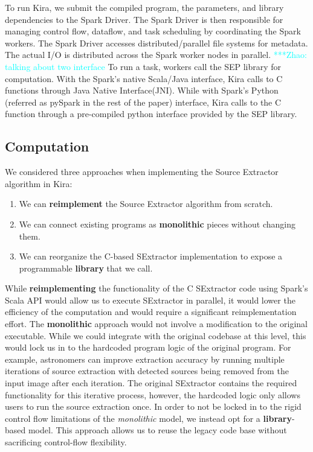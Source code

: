 \documentclass[10pt,journal,compsoc]{IEEEtran}
\newcommand{\zhaonote}[1]{{\textcolor{cyan}    { ***Zhao:      #1 }}}
\newcommand{\zhaonote}[1]{}
\begin{document}
To run Kira, we submit the compiled program, the parameters, and library dependencies to the Spark Driver.
The Spark Driver is then responsible for managing control flow, dataflow, and task scheduling 
by coordinating the Spark workers. 
The Spark Driver accesses distributed/parallel file systems for metadata.
The actual I/O is distributed across the Spark worker nodes in parallel. 
\zhaonote{talking about two interface}
To run a task, workers call the SEP library for computation.
With the Spark's native Scala/Java interface, Kira calls to C functions through Java Native Interface(JNI).
While with Spark's Python (referred as pySpark in the rest of the paper) interface, Kira calls to the C function through
a pre-compiled python interface provided by the SEP library. 

\subsection{Computation}
\label{sec:Design-Computation}
We considered three approaches when implementing the Source Extractor algorithm in Kira:

\begin{enumerate}
\item We can \textbf{reimplement} the Source Extractor algorithm from scratch.
\item We can connect existing programs as \textbf{monolithic} pieces without changing them.
\item We can reorganize the C-based SExtractor implementation to expose a programmable
\textbf{library} that we call.
\end{enumerate}

While \textbf{reimplementing} the functionality of the C SExtractor code using Spark's Scala API 
would allow us to execute SExtractor in parallel, it would lower the efficiency of the computation 
and would require a significant reimplementation effort.
The \textbf{monolithic} approach would not involve a modification to the original executable. While we could 
integrate with the original codebase at this level, this would lock us in to the hardcoded program logic 
of the original program. 
For example, astronomers can improve extraction accuracy by running multiple iterations of source
extraction with detected sources being removed from the input image after each iteration. 
The original SExtractor contains the required functionality for this iterative process, however, the hardcoded
logic only allows users to run the source extraction once.  
In order to not be locked in to the rigid control flow limitations of the \emph{monolithic} model, 
we instead opt for a \textbf{library}-based model.
This approach allows us to reuse the legacy code base without sacrificing control-flow flexibility.  
\end{document}
